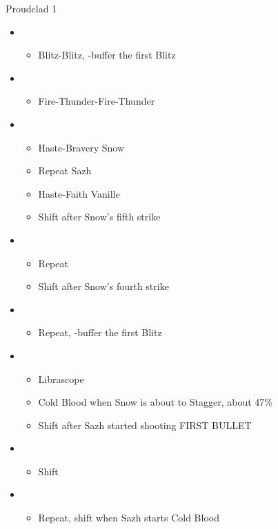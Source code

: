 \begin{battle}{Proudclad 1}
\begin{itemize}
    \item \second
    \begin{itemize}
        \item Blitz-Blitz, \rav-buffer the first Blitz
    \end{itemize}
    \item \sixth
    \begin{itemize}
        \item Fire-Thunder-Fire-Thunder
    \end{itemize}
    \item \fourth
    \begin{itemize}
        \item Haste-Bravery Snow
        \item Repeat Sazh
        \item Haste-Faith Vanille
        \item Shift after Snow's fifth strike
    \end{itemize}
    \item \sixth
    \begin{itemize}
        \item Repeat
        \item Shift after Snow's fourth strike
    \end{itemize}
    \item \first
    \begin{itemize}
        \item Repeat, \rav-buffer the first Blitz
    \end{itemize}
    \item \fifth
    \begin{itemize}
        \item Librascope
        \item Cold Blood when Snow is about to Stagger, about 47\%
        \item Shift after Sazh started shooting FIRST BULLET
    \end{itemize}
    \item \sixth
    \begin{itemize}
        \item Shift
    \end{itemize}
    \item \fifth
    \begin{itemize}
        \item Repeat, shift when Sazh starts Cold Blood

\end{itemize}
\end{itemize}
\end{battle}
